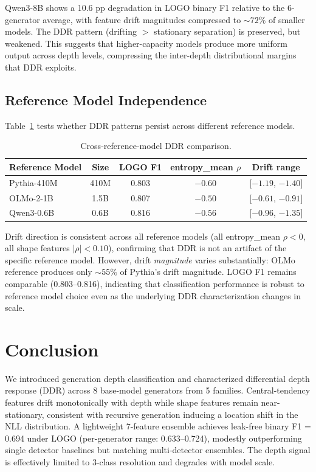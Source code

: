 \documentclass[11pt,a4paper]{article}
\begin{document}
Qwen3-8B shows a 10.6 pp degradation in LOGO binary F1 relative to the 6-generator average, with feature drift magnitudes compressed to ${\sim}72\%$ of smaller models. The DDR pattern (drifting $>$ stationary separation) is preserved, but weakened. This suggests that higher-capacity models produce more uniform output across depth levels, compressing the inter-depth distributional margins that DDR exploits.

\subsection{Reference Model Independence}

Table~\ref{tab:ref_model} tests whether DDR patterns persist across different reference models.

\begin{table}[t]
\centering
\small
\caption{Cross-reference-model DDR comparison.}
\label{tab:ref_model}
\begin{tabular}{lcccc}
\toprule
Reference Model & Size & LOGO F1 & entropy\_mean $\rho$ & Drift range \\
\midrule
Pythia-410M & 410M & 0.803 & $-0.60$ & [$-1.19$, $-1.40$] \\
OLMo-2-1B & 1.5B & 0.807 & $-0.50$ & [$-0.61$, $-0.91$] \\
Qwen3-0.6B & 0.6B & 0.816 & $-0.56$ & [$-0.96$, $-1.35$] \\
\bottomrule
\end{tabular}
\end{table}

Drift direction is consistent across all reference models (all entropy\_mean $\rho < 0$, all shape features $|\rho| < 0.10$), confirming that DDR is not an artifact of the specific reference model. However, drift \emph{magnitude} varies substantially: OLMo reference produces only ${\sim}55\%$ of Pythia's drift magnitude. LOGO F1 remains comparable (0.803--0.816), indicating that classification performance is robust to reference model choice even as the underlying DDR characterization changes in scale.

\section{Conclusion}

We introduced generation depth classification and characterized differential depth response (DDR) across 8 base-model generators from 5 families. Central-tendency features drift monotonically with depth while shape features remain near-stationary, consistent with recursive generation inducing a location shift in the NLL distribution. A lightweight 7-feature ensemble achieves leak-free binary F1 = 0.694 under LOGO (per-generator range: 0.633--0.724), modestly outperforming single detector baselines but matching multi-detector ensembles. The depth signal is effectively limited to 3-class resolution and degrades with model scale.
\end{document}
